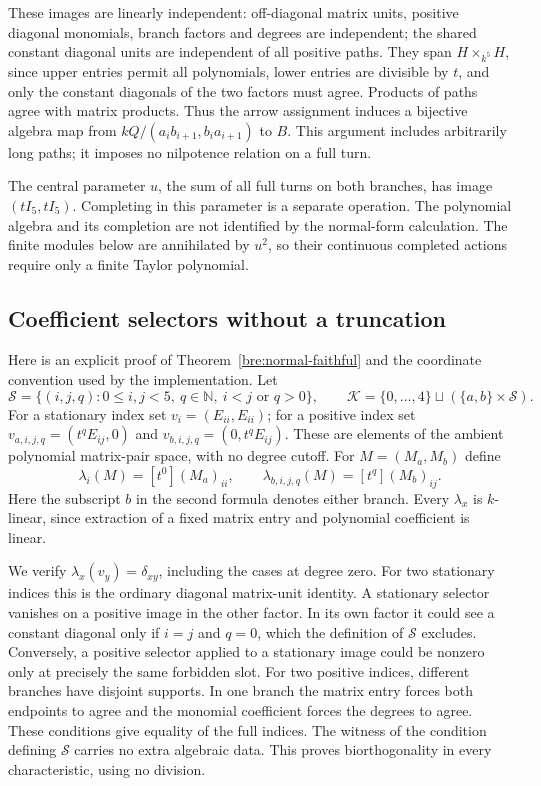 \documentclass[11pt]{article}
\theoremstyle{definition}\newtheorem{definition}[theorem]{Definition}
\theoremstyle{remark}\newtheorem{remark}[theorem]{Remark}
\begin{document}
These images are linearly independent: off-diagonal matrix units,
positive diagonal monomials, branch factors and degrees are independent;
the shared constant diagonal units are independent of all positive
paths. They span $H\times_{k^5}H$, since upper entries permit all
polynomials, lower entries are divisible by $t$, and only the constant
diagonals of the two factors must agree. Products of paths agree with
matrix products. Thus the arrow assignment induces a bijective algebra
map from $kQ/(a_ib_{i+1},b_ia_{i+1})$ to $B$. This argument includes
arbitrarily long paths; it imposes no nilpotence relation on a full turn.

The central parameter $u$, the sum of all full turns on both branches,
has image $(tI_5,tI_5)$. Completing in this parameter is a separate
operation. The polynomial algebra and its completion are not identified
by the normal-form calculation. The finite modules below are annihilated
by $u^2$, so their continuous completed actions require only a finite
Taylor polynomial.

\subsection{Coefficient selectors without a truncation}
Here is an explicit proof of Theorem~\ref{bre:normal-faithful} and the
coordinate convention used by the implementation. Let
\[
 \mathcal S=\{(i,j,q):0\leq i,j<5,\ q\in\mathbb N,
                      \ i<j\text{ or }q>0\},\qquad
 \mathcal K=\{0,\ldots,4\}\sqcup(\{a,b\}\times\mathcal S).
\]
For a stationary index set $v_i=(E_{ii},E_{ii})$; for a positive index
set $v_{a,i,j,q}=(t^qE_{ij},0)$ and
$v_{b,i,j,q}=(0,t^qE_{ij})$. These are elements of the ambient polynomial
matrix-pair space, with no degree cutoff. For $M=(M_a,M_b)$ define
\[
 \lambda_i(M)=[t^0](M_a)_{ii},\qquad
 \lambda_{b,i,j,q}(M)=[t^q](M_b)_{ij}.
\]
Here the subscript $b$ in the second formula denotes either branch.
Every $\lambda_x$ is $k$-linear, since extraction of a fixed matrix entry
and polynomial coefficient is linear.

We verify $\lambda_x(v_y)=\delta_{xy}$, including the cases at degree
zero. For two stationary indices this is the ordinary diagonal matrix-unit
identity. A stationary selector vanishes on a positive image in the other
factor. In its own factor it could see a constant diagonal only if
$i=j$ and $q=0$, which the definition of $\mathcal S$ excludes. Conversely,
a positive selector applied to a stationary image could be nonzero only
at precisely the same forbidden slot. For two positive indices, different
branches have disjoint supports. In one branch the matrix entry forces
both endpoints to agree and the monomial coefficient forces the degrees
to agree. These conditions give equality of the full indices. The witness
of the condition defining $\mathcal S$ carries no extra algebraic data.
This proves biorthogonality in every characteristic, using no division.
\end{document}
